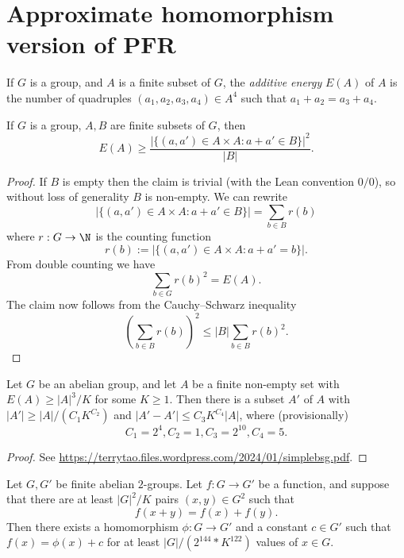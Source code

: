 \chapter{Approximate homomorphism version of PFR}

\begin{definition}
  \label{energy-def}
  \leanok
  If $G$ is a group, and $A$ is a finite subset of $G$, the \emph{additive energy} $E(A)$ of $A$
  is the number of quadruples $(a_1,a_2,a_3,a_4) \in A^4$ such that $a_1+a_2 = a_3+a_4$.
\end{definition}

\begin{lemma}
  \label{cs-bound}
  \leanok

  If $G$ is a group, $A,B$ are finite subsets of $G$, then
  $$E(A) \geq \frac{|\{ (a,a') \in A \times A: a+a' \in B \}|^2}{|B|}.$$
\end{lemma}
\begin{proof}
  \leanok

  If $B$ is empty then the claim is trivial (with the Lean convention $0/0$),
  so without loss of generality $B$ is non-empty.  We can rewrite
  $$ |\{ (a,a') \in A \times A: a+a' \in B \}| = \sum_{b \in B} r(b)$$
  where $r: G \to \N$ is the counting function
  $$ r(b) := |\{ (a,a') \in A \times A: a+a' = b \}|.$$
  From double counting we have
  $$ \sum_{b \in G} r(b)^2 = E(A).$$
  The claim now follows from the Cauchy--Schwarz inequality
  $$ (\sum_{b \in B} r(b))^2 \leq |B| \sum_{b \in B} r(b)^2.$$
\end{proof}

\begin{lemma}
  \label{bsg}
  \leanok

  Let $G$ be an abelian group, and let $A$ be a finite non-empty set
  with $E(A) \geq |A|^3 / K$ for some $K \geq 1$.
  Then there is a subset $A'$ of $A$ with $|A'| \geq |A| / (C_1 K^{C_2})$ and
  $|A'-A'| \leq C_3 K^{C_4} |A|$, where (provisionally)
  $$C_1 = 2^4, C_2 = 1, C_3 = 2^{10}, C_4 = 5.$$
\end{lemma}
\begin{proof}
  \leanok

  See \url{https://terrytao.files.wordpress.com/2024/01/simplebsg.pdf}.
\end{proof}

\begin{theorem}\label{approx-hom-pfr}\leanok Let $G,G'$ be finite abelian $2$-groups.
  Let $f: G \to G'$ be a function, and suppose that there are at least $|G|^2 / K$ pairs $(x,y) \in G^2$ such that
$$ f(x+y) = f(x) + f(y).$$
Then there exists a homomorphism $\phi: G \to G'$ and a constant $c \in G'$
such that $f(x) = \phi(x)+c$ for at least $|G| / (2 ^ {144} * K ^ {122})$
values of $x \in G$.
\end{theorem}

